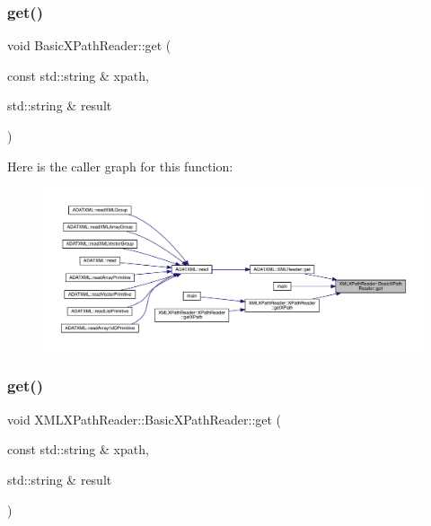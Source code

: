 \mbox{\label{classXMLXPathReader_1_1BasicXPathReader_a167f3e878414daf1c5804ee1de3235e9}} 
\subsubsection{\texorpdfstring{get()}{get()}\hspace{0.1cm}{\footnotesize\ttfamily [1/30]}}
{\footnotesize\ttfamily void Basic\+X\+Path\+Reader\+::get (\begin{DoxyParamCaption}\item[{const std\+::string \&}]{xpath,  }\item[{std\+::string \&}]{result }\end{DoxyParamCaption})}

Here is the caller graph for this function\+:
\nopagebreak
\begin{figure}[H]
\begin{center}
\leavevmode
\includegraphics[width=350pt]{d6/dbf/classXMLXPathReader_1_1BasicXPathReader_a167f3e878414daf1c5804ee1de3235e9_icgraph}
\end{center}
\end{figure}
\mbox{\label{classXMLXPathReader_1_1BasicXPathReader_a3498d5a0bf7d47094e2d8f7d81e629af}} 
\subsubsection{\texorpdfstring{get()}{get()}\hspace{0.1cm}{\footnotesize\ttfamily [2/30]}}
{\footnotesize\ttfamily void X\+M\+L\+X\+Path\+Reader\+::\+Basic\+X\+Path\+Reader\+::get (\begin{DoxyParamCaption}\item[{const std\+::string \&}]{xpath,  }\item[{std\+::string \&}]{result }\end{DoxyParamCaption})}

